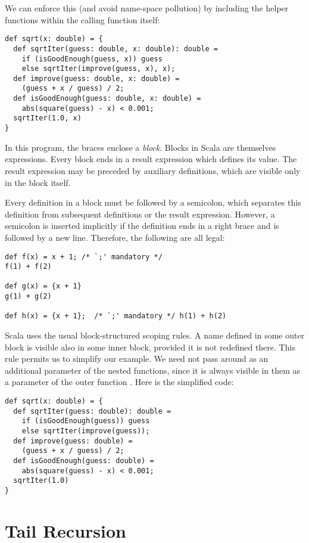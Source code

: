 \documentclass[a4paper,12pt,twoside,titlepage]{book}
\begin{document}
We can enforce this (and avoid name-space pollution) by including
the helper functions within the calling function itself:
\begin{lstlisting}
def sqrt(x: double) = {
  def sqrtIter(guess: double, x: double): double = 
    if (isGoodEnough(guess, x)) guess
    else sqrtIter(improve(guess, x), x);
  def improve(guess: double, x: double) = 
    (guess + x / guess) / 2;
  def isGoodEnough(guess: double, x: double) = 
    abs(square(guess) - x) < 0.001;
  sqrtIter(1.0, x)
}
\end{lstlisting}
In this program, the braces  enclose a {\em block}.
Blocks in Scala are themselves expressions.  Every block ends in a
result expression which defines its value.  The result expression may
be preceded by auxiliary definitions, which are visible only in the
block itself.

Every definition in a block must be followed by a semicolon, which
separates this definition from subsequent definitions or the result
expression. However, a semicolon is inserted implicitly if the
definition ends in a right brace and is followed by a new line.
Therefore, the following are all legal:
\begin{lstlisting}
def f(x) = x + 1; /* `;' mandatory */
f(1) + f(2)

def g(x) = {x + 1}
g(1) + g(2)

def h(x) = {x + 1};  /* `;' mandatory */ h(1) + h(2)
\end{lstlisting}
Scala uses the usual block-structured scoping rules. A name defined in
some outer block is visible also in some inner block, provided it is
not redefined there. This rule permits us to simplify our
 example. We need not pass  around as an additional parameter of
the nested functions, since it is always visible in them as a
parameter of the outer function . Here is the simplified code:
\begin{lstlisting}
def sqrt(x: double) = {
  def sqrtIter(guess: double): double = 
    if (isGoodEnough(guess)) guess
    else sqrtIter(improve(guess));
  def improve(guess: double) = 
    (guess + x / guess) / 2;
  def isGoodEnough(guess: double) = 
    abs(square(guess) - x) < 0.001;
  sqrtIter(1.0)
}
\end{lstlisting}

\section{Tail Recursion}
\end{document}
